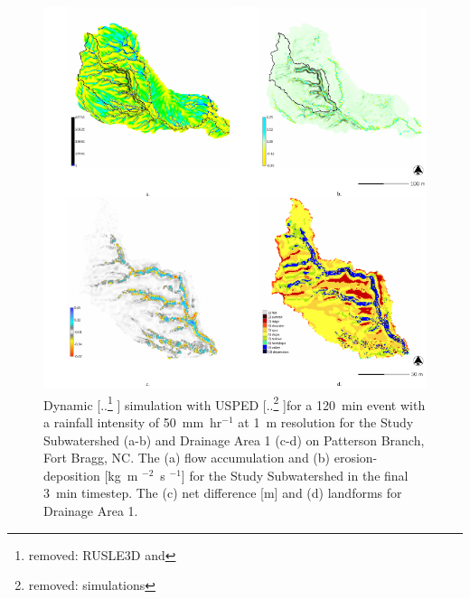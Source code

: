 \documentclass[gmd, manuscript]{copernicus}
\providecommand{\DIFadd}[1]{{\protect\color{blue} \sf #1}} %
\providecommand{\DIFdel}[1]{{\protect\color{red} [..\footnote{removed: #1} ]}} %
\providecommand{\DIFaddFL}[1]{\DIFadd{#1}} %
\providecommand{\DIFdelFL}[1]{\DIFdel{#1}} %
\providecommand{\DIFaddbeginFL}{} %
\providecommand{\DIFaddendFL}{} %
\providecommand{\DIFdelbeginFL}{} %
\providecommand{\DIFdelendFL}{} %
\begin{document}
\begin{figure}
\center
\DIFdelbeginFL %
\DIFdelendFL \DIFaddbeginFL \includegraphics[width=\textwidth,height=0.925\textheight,keepaspectratio]{figures/usped.pdf}
\DIFaddendFL \caption{Dynamic \DIFdelbeginFL \DIFdelFL{RUSLE3D and }\DIFdelendFL \DIFaddbeginFL \DIFaddFL{simulation with }\DIFaddendFL USPED
\DIFdelbeginFL \DIFdelFL{simulations
}\DIFdelendFL for a 120~\unit{min} event 
with a rainfall intensity of 50~\unit{mm~hr}$^{-1}$
\DIFaddbeginFL \DIFaddFL{at 1~}\unit{m} \DIFaddFL{resolution for
the Study Subwatershed (a-b)
and Drainage Area 1 (c-d)
on Patterson Branch, Fort Bragg, NC.
The (a) flow accumulation and
(b) erosion-deposition }[\unit{kg~m}\DIFaddFL{$^{-2}$~}\unit{s}\DIFaddFL{$^{-1}$}]
\DIFaddFL{for the Study Subwatershed in the final 3~}\unit{min} \DIFaddFL{timestep.
The (c) net difference }[\unit{m}] \DIFaddFL{and (d) landforms 
for Drainage Area 1.
}\DIFaddendFL }
\DIFdelbeginFL %
\DIFdelendFL \DIFaddbeginFL \label{fig:usped_simulation}
\DIFaddendFL \end{figure}
\end{document}
